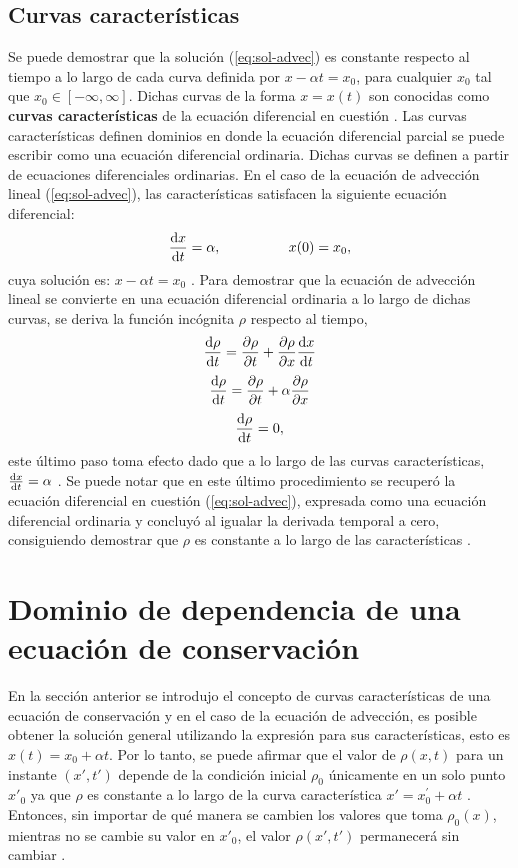 \subsection{Curvas características}
Se puede demostrar que la solución (\ref{eq:sol-advec}) es constante respecto al tiempo a lo largo de cada curva definida por $x-\alpha t = x_0$, para cualquier $x_0$ tal que $x_0 \in [-\infty, \infty]$. Dichas curvas de la forma $x=x(t)$ son conocidas como \textbf{curvas características} de la ecuación diferencial en cuestión \cite{Leveque}. Las curvas características definen dominios en donde la ecuación diferencial parcial se puede escribir como una ecuación diferencial ordinaria. Dichas curvas se definen a partir de ecuaciones diferenciales ordinarias. En el caso de la ecuación de advección lineal (\ref{eq:sol-advec}), las características satisfacen la siguiente ecuación diferencial:
\begin{equation}
	\dv{x}{t} = \alpha, \hspace{1.7cm} x(0) = x_0,
\end{equation}
cuya solución es: $x-\alpha t = x_0$ \cite{Leveque}. Para demostrar que la ecuación de advección lineal se convierte en una ecuación diferencial ordinaria a lo largo de dichas curvas, se deriva la función incógnita $\rho$ respecto al tiempo,
\begin{equation}
	\dv{\rho}{t} = \pdv{\rho}{t} + \pdv{\rho}{x}\dv{x}{t}
\end{equation}
\begin{equation}
	\dv{\rho}{t} = \pdv{\rho}{t} + \alpha\pdv{\rho}{x}
\end{equation}
\begin{equation}
	\dv{\rho}{t} = 0,
\end{equation}
este último paso toma efecto dado que a lo largo de las curvas características, $\dv{x}{t} = \alpha$ \cite{Leveque}. Se puede notar que en este último procedimiento se recuperó la ecuación diferencial en cuestión (\ref{eq:sol-advec}), expresada como una ecuación diferencial ordinaria y concluyó al igualar la derivada temporal a cero, consiguiendo demostrar que $\rho$ es constante a lo largo de las características \cite{Leveque}.
\section{Dominio de dependencia de una ecuación de conservación}
En la sección anterior se introdujo el concepto de curvas características de una ecuación de conservación y en el caso de la ecuación de advección, es posible obtener la solución general utilizando la expresión para sus características, esto es $x(t) = x_0 + \alpha t$. Por lo tanto, se puede afirmar que el valor de $\rho(x,t)$ para un instante $(x',t')$ depende de la condición inicial $\rho_0$ únicamente en un solo punto $x'_{0}$ ya que $\rho$ es constante a lo largo de la curva característica $x' = x^{'}_{0} + \alpha t$ \cite{Leveque}. Entonces, sin importar de qué manera se cambien los valores que toma $\rho_0(x)$, mientras no se cambie su valor en $x'_0$, el valor $\rho(x',t')$ permanecerá sin cambiar \cite{Leveque}. 

